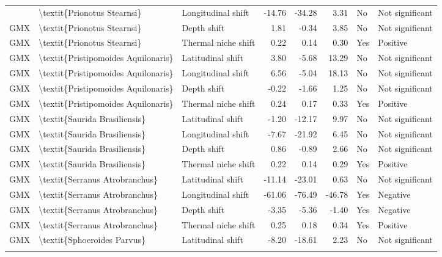\begin{longtable}[t]{lllrrrll}
{{\addlinespace
GMX & \textbackslash{}textit\{Prionotus Stearnsi\} & Longitudinal shift & -14.76 & -34.28 & 3.31 & No & Not significant\\
GMX & \textbackslash{}textit\{Prionotus Stearnsi\} & Depth shift & 1.81 & -0.34 & 3.85 & No & Not significant\\
GMX & \textbackslash{}textit\{Prionotus Stearnsi\} & Thermal niche shift & 0.22 & 0.14 & 0.30 & Yes & Positive\\
GMX & \textbackslash{}textit\{Pristipomoides Aquilonaris\} & Latitudinal shift & 3.80 & -5.68 & 13.29 & No & Not significant\\
GMX & \textbackslash{}textit\{Pristipomoides Aquilonaris\} & Longitudinal shift & 6.56 & -5.04 & 18.13 & No & Not significant\\
\addlinespace
GMX & \textbackslash{}textit\{Pristipomoides Aquilonaris\} & Depth shift & -0.22 & -1.66 & 1.25 & No & Not significant\\
GMX & \textbackslash{}textit\{Pristipomoides Aquilonaris\} & Thermal niche shift & 0.24 & 0.17 & 0.33 & Yes & Positive\\
GMX & \textbackslash{}textit\{Saurida Brasiliensis\} & Latitudinal shift & -1.20 & -12.17 & 9.97 & No & Not significant\\
GMX & \textbackslash{}textit\{Saurida Brasiliensis\} & Longitudinal shift & -7.67 & -21.92 & 6.45 & No & Not significant\\
GMX & \textbackslash{}textit\{Saurida Brasiliensis\} & Depth shift & 0.86 & -0.89 & 2.66 & No & Not significant\\
\addlinespace
GMX & \textbackslash{}textit\{Saurida Brasiliensis\} & Thermal niche shift & 0.22 & 0.14 & 0.29 & Yes & Positive\\
GMX & \textbackslash{}textit\{Serranus Atrobranchus\} & Latitudinal shift & -11.14 & -23.01 & 0.63 & No & Not significant\\
GMX & \textbackslash{}textit\{Serranus Atrobranchus\} & Longitudinal shift & -61.06 & -76.49 & -46.78 & Yes & Negative\\
GMX & \textbackslash{}textit\{Serranus Atrobranchus\} & Depth shift & -3.35 & -5.36 & -1.40 & Yes & Negative\\
GMX & \textbackslash{}textit\{Serranus Atrobranchus\} & Thermal niche shift & 0.25 & 0.18 & 0.34 & Yes & Positive\\
\addlinespace
GMX & \textbackslash{}textit\{Sphoeroides Parvus\} & Latitudinal shift & -8.20 & -18.61 & 2.23 & No & Not significant\\
}}
\end{longtable}
